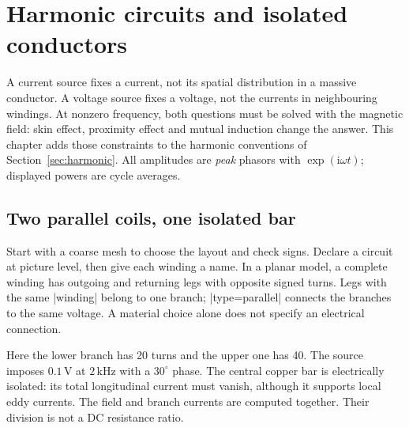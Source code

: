 \section{Harmonic circuits and isolated conductors}
\label{sec:ac-circuits}

A current source fixes a current, not its spatial distribution in a massive
conductor. A voltage source fixes a voltage, not the currents in neighbouring
windings. At nonzero frequency, both questions must be solved with the magnetic
field: skin effect, proximity effect and mutual induction change the answer.
This chapter adds those constraints to the harmonic conventions of
Section~\ref{sec:harmonic}. All amplitudes are \emph{peak} phasors with
$\exp(\mathrm i\omega t)$; displayed powers are cycle averages.

\subsection{Two parallel coils, one isolated bar}
Start with a coarse mesh to choose the layout and check signs. Declare a
circuit at picture level, then give each winding a name. In a planar model,
a complete winding has outgoing and returning legs with opposite signed
turns. Legs with the same |winding| belong to one branch; |type=parallel|
connects the branches to the same voltage. A material choice alone does not
specify an electrical connection.

Here the lower branch has 20 turns and the upper one has 40. The source imposes
$0.1\,\mathrm V$ at $2\,\mathrm{kHz}$ with a $30^\circ$ phase. The central
copper bar is electrically isolated: its total longitudinal current must vanish,
although it supports local eddy currents. The field and branch currents are
computed together. Their division is not a DC resistance ratio.



\begin{codeexample}
\end{codeexample}

